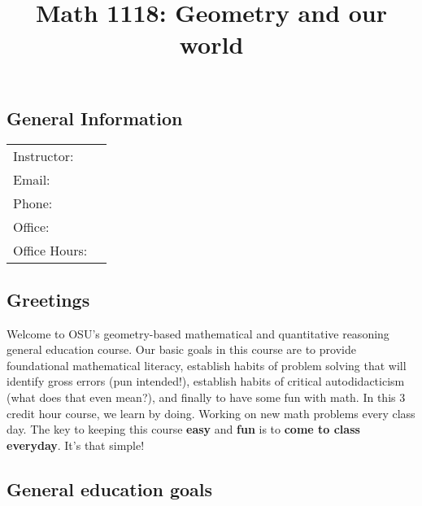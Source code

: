 \documentclass[12pt]{amsart}
\begin{document}
\title{Math 1118: Geometry and our world}%


\maketitle

\subsection*{General Information}\hfill

\begin{tabular}{ll}
  Instructor:   & \\
  Email:        & \\%
  Phone:        & \\
  Office:       & \\%
  Office Hours: & \\  %
\end{tabular}


\subsection*{Greetings}
Welcome to OSU's geometry-based mathematical and quantitative reasoning general
education course. Our basic goals in this course are to provide foundational
mathematical
literacy, establish habits of problem solving that will identify gross
errors (pun intended!), establish habits of critical autodidacticism
(what does that even mean?), and finally to have some fun with math. In this 3
credit hour course, we learn by doing. Working on new math problems every class
day. The key to keeping this course \textbf{easy} and \textbf{fun} is to
\textbf{come to class everyday}. It's that simple!

\subsection*{General education goals}
\end{document}
